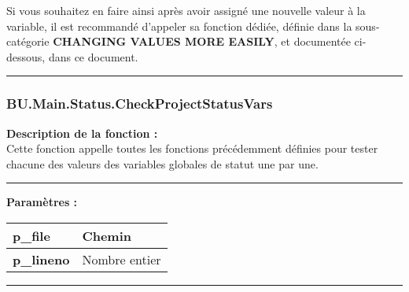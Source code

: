 \documentclass[a4paper,10pt]{article}
\begin{document}
    \begin{justify}
        Si vous souhaitez en faire ainsi après avoir assigné une nouvelle valeur à la variable, il est recommandé d'appeler sa fonction dédiée, définie dans la sous-catégorie \textbf{\color{sec2}CHANGING VALUES MORE EASILY}, et documentée ci-dessous, dans ce document.
    \end{justify}



    \color{sec3}\par\noindent\rule{\textwidth}{0.4pt}\color{text}

    \color{sec3}
    \subsubsection{BU.Main.Status.CheckProjectStatusVars}\color{text}

    \begin{justify}
        \textbf{Description de la fonction :}\\[1\baselineskip]
        Cette fonction appelle toutes les fonctions précédemment définies pour tester chacune des valeurs des variables globales de statut une par une.
    \end{justify}


    \par\noindent\rule{\textwidth}{0.4pt}

    \begin{justify}
        \textbf{Paramètres :}\\[1\baselineskip]
        \begin{tabular}{|l|l|}
            \hline
            \textbf{\color{vars}p\_file} & Chemin\\
            \hline
            \textbf{\color{vars}p\_lineno} & Nombre entier\\
            \hline
        \end{tabular}
    \end{justify}

    \setlength{\parskip}{2em}




    \color{sec2}\par\noindent\rule{\textwidth}{0.4pt}\color{text}
\end{document}
